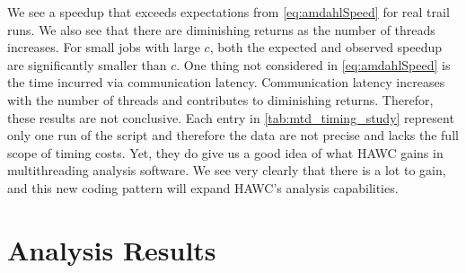We see a speedup that exceeds expectations from \cref{eq:amdahlSpeed} for real trail runs.
We also see that there are diminishing returns as the number of threads increases.
For small jobs with large $c$, both the expected and observed speedup are significantly smaller than $c$.
One thing not considered in \cref{eq:amdahlSpeed} is the time incurred via communication latency.
Communication latency increases with the number of threads and contributes to diminishing returns.
Therefor, these results are not conclusive.
Each entry in \cref{tab:mtd_timing_study} represent only one run of the script and therefore the data are not precise and lacks the full scope of timing costs.
Yet, they do give us a good idea of what HAWC gains in multithreading analysis software.
We see very clearly that there is a lot to gain, and this new coding pattern will expand HAWC's analysis capabilities.

\section{Analysis Results}\label{sec:mtd_results}




